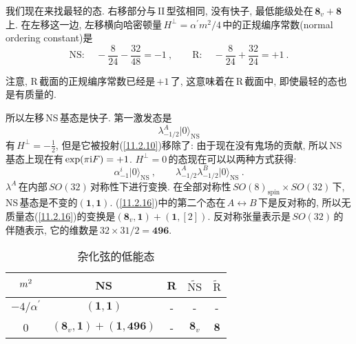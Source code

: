 我们现在来找最轻的态. 右移部分与\,II\,型弦相同, 没有快子, 最低能级处在$\,\mathbf{8}_{v}+\mathbf{8}\,$上. 在左移这一边, 左移横向哈密顿量\,$H^{\bot}=\alpha^{\prime}m^{2}/4\,$中的正规编序常数(normal ordering constant)是
\begin{equation}
    \text{NS}:\quad -\frac{8}{24}-\frac{32}{48} =-1\:, \qquad \text{R}:\quad -\frac{8}{24}+\frac{32}{24}=+1\:.\label{11.2.14} 
\end{equation}
\begin{tcolorbox}
注意, R\,截面的正规编序常数已经是\,$+1$\,了, 这意味着在\,R\,截面中, 即使最轻的态也是有质量的.
\end{tcolorbox}
\noindent 所以左移\,NS\,基态是快子. 第一激发态是
\begin{equation}
    \lambda^{A}_{-1/2}\lvert 0\rangle_{\text{NS}}  \label{11.2.15}
\end{equation}
有\,$H^{\bot}=-\frac{1}{2}$, 但是它被投射(\ref{11.2.10})移除了: 由于现在没有鬼场的贡献, 所以\,NS\,基态上现在有\,$\exp(\pi\mathrm{i} F)=+1$.
$H^{\bot}=0\,$的态现在可以以两种方式获得:
\begin{equation}
\alpha_{-1}^{i}\lvert 0\rangle_{\text{NS}}\:,\qquad \lambda_{-1/2}^{A}\lambda_{-1/2}^{B}\lvert 0\rangle_{\text{NS}} \:. \label{11.2.16}    
\end{equation}
$\lambda^{A}\,$在内部$\,SO(32)\,$对称性下进行变换. 在全部对称性$\,SO(8)_{\text{spin}}\times SO(32)\,$下, NS\,基态是不变的$(\mathbf{1},\mathbf{1})$. (\ref{11.2.16})中的第二个态在$\,A\leftrightarrow B\,$下是反对称的, 所以无质量态(\ref{11.2.16})的变换是$(\mathbf{8}_{v},\mathbf{1})+(\mathbf{1},[2])$. 反对称张量表示是\,$SO(32)\,$的伴随表示, 它的维数是$\,32\times 31/2=\mathbf{496}$. 

\begin{table}[h]
\caption{杂化弦的低能态}
\label{tab:11.2}%
\centering
\begin{tabular}[c]{ccccc}
\hline\hline
 $\vphantom{\Bigl[}m^{2}$ & NS & R & $\widetilde{\text{NS}}$ & $\widetilde{\text{R}}$  \\
\hline
 $-4/\alpha^{\prime}$ & $(\mathbf{1},\mathbf{1})$ & - & - &  -  \\
 0 & $(\mathbf{8}_{v},\mathbf{1})+(\mathbf{1},\mathbf{496})$ & - & $\mathbf{8}_{v}$ & $\mathbf{8}$   \\
 \hline\hline
\end{tabular}
\end{table}

